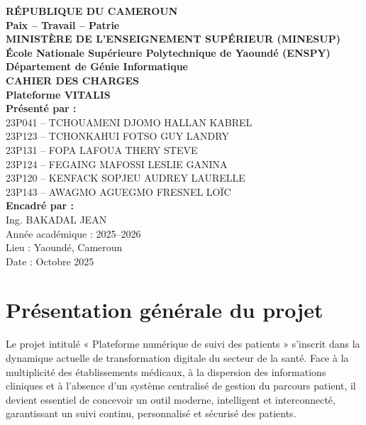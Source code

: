 ﻿\documentclass[12pt,a4paper]{report}
\begin{document}
  

\begin{center}  
\textbf{\large RÉPUBLIQUE DU CAMEROUN}\\[0.2cm]  
\textbf{Paix – Travail – Patrie}\\[0.5cm]  
\textbf{MINISTÈRE DE L’ENSEIGNEMENT SUPÉRIEUR (MINESUP)}\\[0.2cm]  
\textbf{École Nationale Supérieure Polytechnique de Yaoundé (ENSPY)}\\[0.2cm]  
\textbf{Département de Génie Informatique}\\[1.5cm]  
{\Large \textbf{CAHIER DES CHARGES}}\\[0.5cm]  
{\large \textbf{Plateforme VITALIS}}\\[1.5cm]  

\textbf{Présenté par :}\\[0.3cm]  
23P041 – TCHOUAMENI DJOMO HALLAN KABREL\\
23P123 – TCHONKAHUI FOTSO GUY LANDRY\\
23P131 – FOPA LAFOUA THERY STEVE\\
23P124 – FEGAING MAFOSSI LESLIE GANINA\\
23P120 – KENFACK SOPJEU AUDREY LAURELLE\\
23P143 – AWAGMO AGUEGMO FRESNEL LOÏC\\[1cm]  

\textbf{Encadré par :}\\[0.3cm]  
Ing. BAKADAL JEAN\\[1.5cm]  

Année académique : 2025–2026\\
Lieu : Yaoundé, Cameroun\\
Date : Octobre 2025  
\end{center}  

\newpage  
\tableofcontents  
\newpage  


\section*{Présentation générale du projet}  

Le projet intitulé « Plateforme numérique de suivi des patients » s'inscrit dans la dynamique actuelle de transformation digitale du secteur de la santé.  
Face à la multiplicité des établissements médicaux, à la dispersion des informations cliniques et à l'absence d'un système centralisé de gestion du parcours patient, il devient essentiel de concevoir un outil moderne, intelligent et interconnecté, garantissant un suivi continu, personnalisé et sécurisé des patients.  
\end{document}
